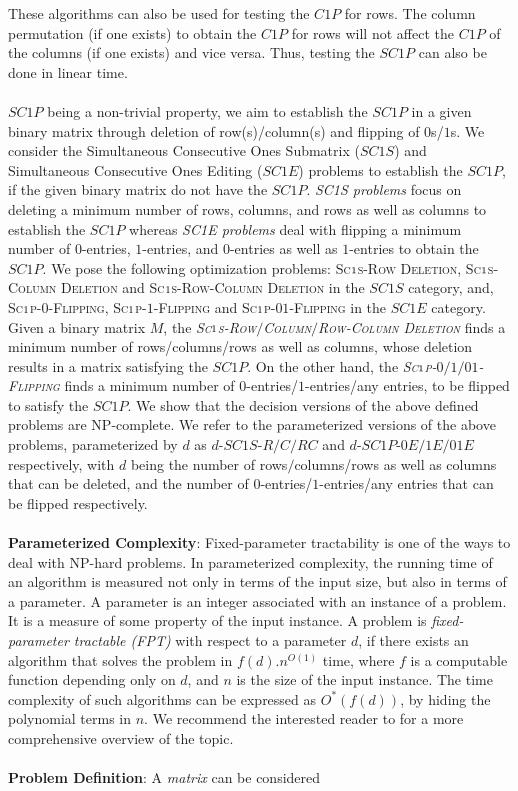 \documentclass[review, 1p]{elsarticle}
\begin{document}
These algorithms can also be used for testing the $C1P$ for rows. The column permutation (if one exists) to obtain the $C1P$ for rows will not affect the $C1P$ of the columns (if one exists) and vice versa. Thus, testing the $SC1P$ can also be done in linear time. \\\\$SC1P$ being a non-trivial property, we aim to establish the $SC1P$ in a given binary matrix through deletion of row(s)/column(s) and flipping of $0$s/$1$s. We consider the Simultaneous Consecutive Ones Submatrix ($SC1S$) and Simultaneous Consecutive Ones Editing ($SC1E$) \cite{oswald2009simultaneous} problems to establish the $SC1P$, if the given binary matrix do not have the $SC1P$. \textit{SC1S problems} focus on deleting a minimum number of rows, columns, and rows as well as columns to establish the $SC1P$ whereas \textit{SC1E problems} deal with flipping a minimum number of $0$-entries, $1$-entries, and $0$-entries as well as $1$-entries to obtain the $SC1P$. We pose the following optimization problems: \textsc{Sc$\mathsmaller1$s-Row Deletion}\label{opt}, \textsc{Sc$\mathsmaller 1$s-Column Deletion} and \textsc{Sc$\mathsmaller 1$s-Row-Column Deletion} in the $SC1S$ category, and, \textsc{Sc$ \mathsmaller 1$p-$0$-Flipping}, \textsc{Sc$ \mathsmaller 1$p-$1$-Flipping} and \textsc{Sc$\mathsmaller1$p-$01$-Flipping} in the $SC1E$ category. Given a binary matrix $M$, the \textit{\textsc{Sc$\mathsmaller1$s-Row$/$Column$/$Row-Column Deletion}} finds a minimum number of rows/columns/rows as well as columns, whose deletion results in a matrix satisfying the $SC1P$. On the other hand, the \textit{\textsc{Sc$ \mathsmaller 1$p-$0/1/01$-Flipping}} finds a minimum number of $0$-entries/$1$-entries/any entries, to be flipped to satisfy the $SC1P$. We show that the decision versions of the above defined problems are NP-complete. We refer to the parameterized versions of the above problems, parameterized by $d$ as $d$-$SC1S$-$R/C/RC$ and $d$-$SC1P$-$0E/1E/01E$ respectively, with $d$ being the number of rows$/$columns/rows as well as columns that can be deleted, and the number of $0$-entries/$1$-entries/any entries that can be flipped respectively. \\\\ \textbf{Parameterized Complexity}: Fixed-parameter tractability is one of the ways to deal with NP-hard problems. In parameterized complexity, the running time of an algorithm is measured not only in terms of the input size, but also in terms of a parameter. A parameter is an integer associated with an instance of a problem. It is a measure of some property of the input instance. A problem is \textit{fixed-parameter tractable (FPT)} with respect to a parameter $d$, if there exists an algorithm that solves the problem in $f(d).n^{O(1)}$ time, where $f$ is a computable function depending only on $d$, and $n$ is the size of the input instance. The time complexity of such algorithms can be expressed as $O^{*}(f(d))$, by hiding the polynomial terms in $n$. We recommend the interested reader to \cite{downey2013fundamentals} for a more comprehensive overview of the topic.\\\\ \textbf{Problem Definition}: A \textit{matrix} can be considered 
\end{document}
